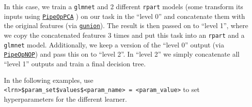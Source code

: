 \documentclass[
]{scrbook}
\begin{document}
In this case, we train a \texttt{glmnet} and 2 different \texttt{rpart} models (some transform its inputs using \href{https://mlr3pipelines.mlr-org.com/reference/mlr_pipeops_pca.html}{\texttt{PipeOpPCA}} ) on our task in the ``level 0'' and concatenate them with the original features (via \href{https://mlr3pipelines.mlr-org.com/reference/gunion.html}{\texttt{gunion}}).
The result is then passed on to ``level 1'', where we copy the concatenated features 3 times and put this task into an \texttt{rpart} and a \texttt{glmnet} model.
Additionally, we keep a version of the ``level 0'' output (via \href{https://mlr3pipelines.mlr-org.com/reference/mlr_pipeops_nop.html}{\texttt{PipeOpNOP}}) and pass this on to ``level 2''.
In ``level 2'' we simply concatenate all ``level 1'' outputs and train a final decision tree.

In the following examples, use \texttt{\textless{}lrn\textgreater{}\$param\_set\$values\$\textless{}param\_name\textgreater{}\ =\ \textless{}param\_value\textgreater{}} to set hyperparameters
for the different learner.
\end{document}
